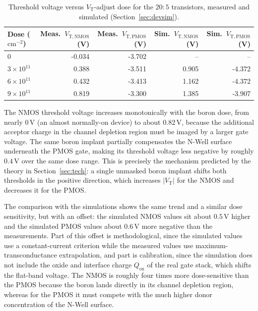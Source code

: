 \begin{table}[htbp]
  \centering
  \caption{Threshold voltage versus $V_\mathrm{T}$-adjust dose for the $20\!:\!5$ transistors, measured and simulated (Section~\ref{sec:devsim}).}
  \label{tab:ch6-vt-dose}
  \begin{tabular}{lrrrr}
    \toprule
    Dose ($\mathrm{cm}^{-2}$) & Meas.\ $V_\mathrm{T,NMOS}$ (V) & Meas.\ $V_\mathrm{T,PMOS}$ (V) & Sim.\ $V_\mathrm{T,NMOS}$ (V) & Sim.\ $V_\mathrm{T,PMOS}$ (V) \\
    \midrule
    $0$              & -0.034 & -3.702 & --    & --    \\
    $3\times10^{11}$ &  0.388 & -3.511 & 0.905 & -4.372 \\
    $6\times10^{11}$ &  0.432 & -3.413 & 1.162 & -4.372 \\
    $9\times10^{11}$ &  0.819 & -3.300 & 1.385 & -3.907 \\
    \bottomrule
  \end{tabular}
\end{table}

The NMOS threshold voltage increases monotonically with the boron dose, from nearly $0$\,V (an almost normally-on device) to about $0.82$\,V, because the additional acceptor charge in the channel depletion region must be imaged by a larger gate voltage. The same boron implant partially compensates the N-Well surface underneath the PMOS gate, making its threshold voltage less negative by roughly $0.4$\,V over the same dose range. This is precisely the mechanism predicted by the theory in Section~\ref{sec:tech}: a single unmasked boron implant shifts both thresholds in the positive direction, which increases $|V_\mathrm{T}|$ for the NMOS and decreases it for the PMOS.

The comparison with the simulations shows the same trend and a similar dose sensitivity, but with an offset: the simulated NMOS values sit about $0.5$\,V higher and the simulated PMOS values about $0.6$\,V more negative than the measurements. Part of this offset is methodological, since the simulated values use a constant-current criterion while the measured values use maximum-transconductance extrapolation, and part is calibration, since the simulation does not include the oxide and interface charge $Q_\mathrm{ox}$ of the real gate stack, which shifts the flat-band voltage. The NMOS is roughly four times more dose-sensitive than the PMOS because the boron lands directly in its channel depletion region, whereas for the PMOS it must compete with the much higher donor concentration of the N-Well surface.

